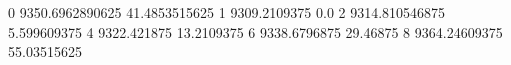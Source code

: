 0 9350.6962890625 41.4853515625
1 9309.2109375 0.0
2 9314.810546875 5.599609375
4 9322.421875 13.2109375
6 9338.6796875 29.46875
8 9364.24609375 55.03515625
